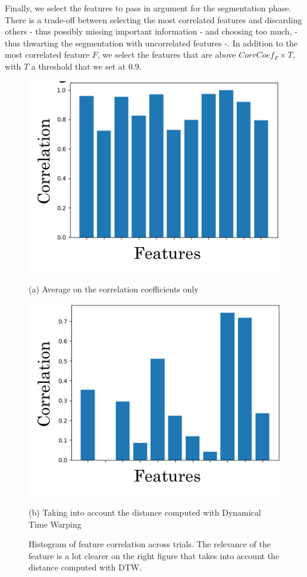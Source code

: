 \documentclass[conference]{IEEEtran}
\begin{document}
Finally, we select the features to pass in argument for the segmentation phase. There is a trade-off between selecting the most correlated features and discarding others - thus possibly missing important information - and choosing too much, - thus thwarting the segmentation with uncorrelated features -. In  addition to the most correlated feature $F$, we select the features that are above $CorrCoef_{F} \times T$, with $T$ a threshold that we set at $0.9$. \newline

\begin{figure}[t]
  \centering

  \begin{minipage}[t]{0.49\linewidth}
    \centering
    \includegraphics[width=0.95\linewidth]{img/hist_raw.pdf}
    \caption*{(a) Average on the correlation coefficients only}
  \end{minipage}
  \hfill
  \begin{minipage}[t]{0.49\linewidth}
    \centering
    \includegraphics[width=0.95\linewidth]{img/hist_dtw.pdf}
    \caption*{(b) Taking into account the  distance computed with Dynamical Time Warping}
  \end{minipage}

\caption{Histogram of feature correlation across trials. The relevance of the feature is a lot clearer on the right figure that takes into account the distance computed with DTW.}
  \label{fig:histcorr}
\end{figure}
\end{document}
